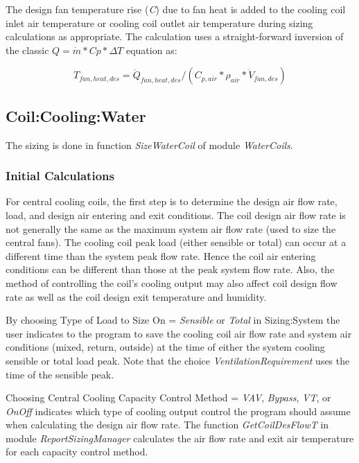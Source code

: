 The design fan temperature rise (\emph{C}) due to fan heat is added to the cooling coil inlet air temperature or cooling coil outlet air temperature during sizing calculations as appropriate. The calculation uses a straight-forward inversion of the classic \(Q = \dot{m}*Cp*\Delta{T}\) equation as:

\begin{equation}
T_{fan,heat,des} = \dot{Q}_{fan,heat,des} / ( {C}_{p,air} * \rho_{air} * \dot{V}_{fan,des} )
\end{equation}

\subsection{Coil:Cooling:Water}\label{coilcoolingwater}

The sizing is done in function \emph{SizeWaterCoil} of module \emph{WaterCoils}.

\subsubsection{Initial Calculations}\label{initial-calculations}

For central cooling coils, the first step is to determine the design air flow rate, load, and design air entering and exit conditions. The coil design air flow rate is not generally the same as the maximum system air flow rate (used to size the central fans). The cooling coil peak load (either sensible or total) can occur at a different time than the system peak flow rate. Hence the coil air entering conditions can be different than those at the peak system flow rate. Also, the method of controlling the coil's cooling output may also affect coil design flow rate as well as the coil design exit temperature and humidity.

By choosing Type of Load to Size On = \emph{Sensible} or \emph{Total} in Sizing:System the user indicates to the program to save the cooling coil air flow rate and system air conditions (mixed, return, outside) at the time of either the system cooling sensible or total load peak. Note that the choice \emph{VentilationRequirement} uses the time of the sensible peak.

Choosing Central Cooling Capacity Control Method = \emph{VAV}, \emph{Bypass}, \emph{VT}, or \emph{OnOff} indicates which type of cooling output control the program should assume when calculating the design air flow rate. The function \emph{GetCoilDesFlowT} in module \emph{ReportSizingManager} calculates the air flow rate and exit air temperature for each capacity control method.

